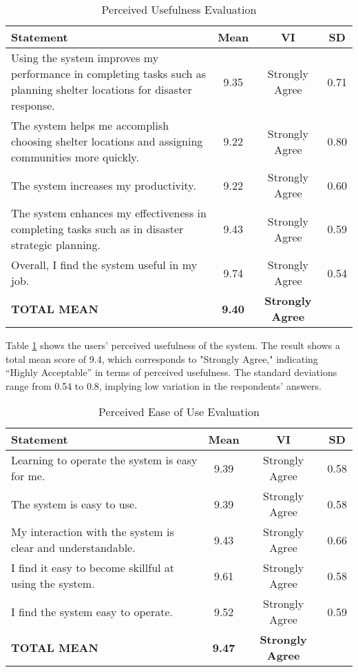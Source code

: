 \documentclass[12pt,a4paper,]{article}
\begin{document}
	\begin{table}[h!]
		\centering
		\caption{Perceived Usefulness Evaluation}
		\label{percuse}
		\renewcommand{\arraystretch}{1.2}
		\begin{tabularx}{\linewidth}{|X|c|c|c|}
			\hline
			\textbf{Statement} & \textbf{Mean} & \textbf{VI} & \textbf{SD} \\ \hline
			Using the system improves my performance in completing tasks such as planning shelter locations for disaster response.
			& 9.35 & Strongly Agree & 0.71 \\ \hline
			The system helps me accomplish choosing shelter locations and assigning communities more quickly.
			& 9.22 & Strongly Agree & 0.80 \\ \hline
			The system increases my productivity.
			& 9.22 & Strongly Agree & 0.60 \\ \hline
			The system enhances my effectiveness in completing tasks such as in disaster strategic planning.
			& 9.43 & Strongly Agree & 0.59 \\ \hline
			Overall, I find the system useful in my job.
			& 9.74 & Strongly Agree & 0.54 \\ \hline
			\textbf{TOTAL MEAN} & \textbf{9.40} & \textbf{Strongly Agree} & \\ \hline
		\end{tabularx}
	\end{table}
	
	Table \ref{percuse} shows the users’ perceived usefulness of the system. The result shows a total mean score of 9.4, which corresponds to "Strongly Agree," indicating “Highly Acceptable” in terms of perceived usefulness. The standard deviations range from 0.54 to 0.8, implying low variation in the respondents’ answers.
	
	\begin{table}[h!]
		\centering
		\caption{Perceived Ease of Use Evaluation}
		\label{percease}
		\renewcommand{\arraystretch}{1.2}
		\begin{tabularx}{\linewidth}{|X|c|c|c|}
			\hline
			\textbf{Statement} & \textbf{Mean} & \textbf{VI} & \textbf{SD} \\ \hline
			Learning to operate the system is easy for me.
			& 9.39 & Strongly Agree & 0.58 \\ \hline
			The system is easy to use.
			& 9.39 & Strongly Agree & 0.58 \\ \hline
			My interaction with the system is clear and understandable.
			& 9.43 & Strongly Agree & 0.66 \\ \hline
			I find it easy to become skillful at using the system.
			& 9.61 & Strongly Agree & 0.58 \\ \hline
			I find the system easy to operate.
			& 9.52 & Strongly Agree & 0.59 \\ \hline
			\textbf{TOTAL MEAN} & \textbf{9.47} & \textbf{Strongly Agree} & \\ \hline
		\end{tabularx}
	\end{table}
	
\end{document}
